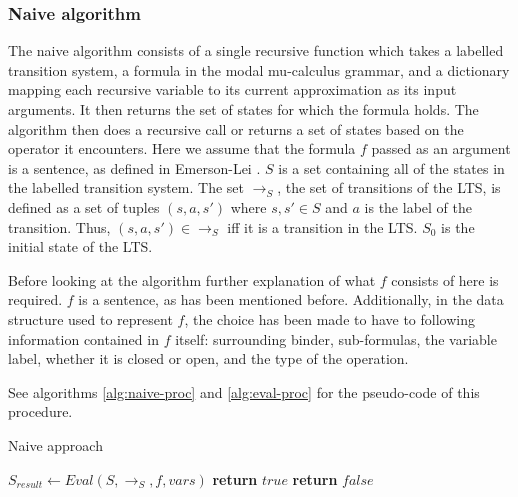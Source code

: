\documentclass[10pt,a4paper]{article}
\begin{document}
\subsubsection{Naive algorithm}
The naive algorithm consists of a single recursive function which takes a labelled transition system, a formula in the modal mu-calculus grammar, and a dictionary mapping each recursive variable to its current approximation as its input arguments. It then returns the set of states for which the formula holds. The algorithm then does a recursive call or returns a set of states based on the operator it encounters. Here we assume that the formula $f$ passed as an argument is a sentence, as defined in Emerson-Lei \cite{elpaper}. $S$ is a set containing all of the states in the labelled transition system. The set $\to_S$, the set of transitions of the LTS, is defined as a set of tuples $(s,a,s\prime)$ where $s,s\prime \in S$ and $a$ is the label of the transition. Thus, $(s,a,s\prime) \in \to_S$ iff it is a transition in the LTS. $S_0$ is the initial state of the LTS.

Before looking at the algorithm further explanation of what $f$ consists of here is required. $f$ is a sentence, as has been mentioned before. Additionally, in the data structure used to represent $f$, the choice has been made to have to following information contained in $f$ itself: surrounding binder, sub-formulas, the variable label, whether it is closed or open, and the type of the operation. 

See algorithms \ref{alg:naive-proc} and \ref{alg:eval-proc} for the pseudo-code of this procedure.

\begin{algorithm}[H]
\caption{Naive approach}\label{alg:naive-proc}
\begin{algorithmic}[1]
	\State $S_{result} \gets Eval(S, \to_S,f, vars)$
        	\State \textbf{return} $true$ 
        \Else
			\State \textbf{return} $false$ 
		\EndIf
	\EndProcedure
\end{algorithmic}
\end{algorithm}
\end{document}
